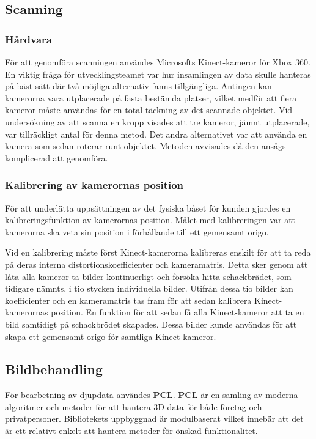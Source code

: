 \documentclass[a4paper,12pt,oneside,final]{extbook}
\begin{document}
\subsection{Scanning}
\subsubsection{Hårdvara}
För att genomföra scanningen användes Microsofts Kinect-kameror för Xbox 360. En viktig fråga för utvecklingsteamet var hur insamlingen av data skulle hanteras på bäst sätt där två möjliga alternativ fanns tillgängliga. Antingen kan kamerorna vara utplacerade på fasta bestämda platser, vilket medför att flera kameror måste användas för en total täckning av det scannade objektet. Vid undersökning av att scanna en kropp visades att tre kameror, jämnt utplacerade, var tillräckligt antal för denna metod. Det andra alternativet var att använda en kamera som sedan roterar runt objektet. Metoden avvisades då den ansågs komplicerad att genomföra. 

\subsubsection{Kalibrering av kamerornas position}
För att underlätta uppsättningen av det fysiska båset för kunden gjordes en kalibreringsfunktion av kamerornas position. Målet med kalibreringen var att kamerorna ska veta sin position i förhållande till ett gemensamt origo.

Vid en kalibrering måste först Kinect-kamerorna kalibreras enskilt för att ta reda på deras interna distortionskoefficienter och kameramatris. Detta sker genom att låta alla kameror ta bilder kontinuerligt och försöka hitta schackbrädet, som tidigare nämnts, i tio stycken individuella bilder. Utifrån dessa tio bilder kan koefficienter och en kameramatris tas fram för att sedan kalibrera Kinect-kamerornas position. En funktion för att sedan få alla Kinect-kameror att ta en bild samtidigt på schackbrödet skapades. Dessa bilder kunde användas för att skapa ett gemensamt origo för samtliga Kinect-kameror\cite{kinectextrinc}.

\subsection{Bildbehandling}
För bearbetning av djupdata användes \textbf{PCL}. \textbf{PCL} är en samling av moderna algoritmer och metoder för att hantera 3D-data för både företag och privatpersoner. Bibliotekets uppbyggnad är modulbaserat vilket innebär att det är ett relativt enkelt att hantera metoder för önskad funktionalitet\cite{pcl}.
\end{document}
